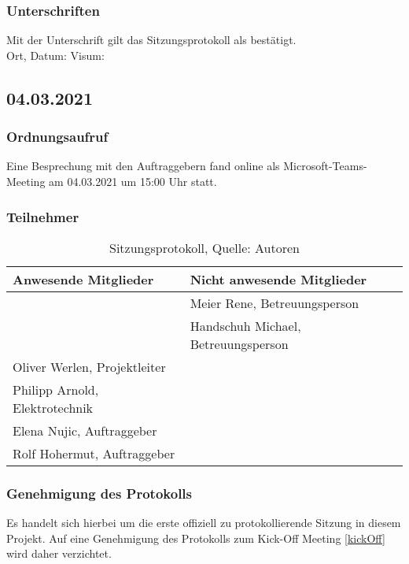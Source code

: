 \subsubsection{Unterschriften}

Mit der Unterschrift gilt das Sitzungsprotokoll als bestätigt.\\

Ort, Datum:	\underline{\hspace*{6cm}}	\hspace*{1cm} Visum:	\underline{\hspace*{4cm}}
\newpage


\subsection{04.03.2021}
\subsubsection{Ordnungsaufruf}
Eine Besprechung mit den Auftraggebern fand online als Microsoft-Teams-Meeting am 04.03.2021 um 15:00 Uhr statt.
\subsubsection{Teilnehmer}
\begin{table}[H]
	\setlength\extrarowheight{2pt} %
	\begin{tabularx}{\textwidth}{|X|X|}
		\hline
		\textbf{Anwesende Mitglieder} &  \textbf{Nicht anwesende Mitglieder} \\
		\hline
		& Meier Rene, Betreuungsperson  \\
		& Handschuh Michael, Betreuungsperson   \\
		Oliver Werlen, Projektleiter &  \\
		Philipp Arnold, Elektrotechnik & \\
		Elena Nujic, Auftraggeber & \\
		Rolf Hohermut, Auftraggeber & \\
		\hline
	\end{tabularx}
	\caption{ \label{tbl: Teilnehmerliste vom 04.03.2021}Sitzungsprotokoll, Quelle: Autoren}
\end{table}
\subsubsection{Genehmigung des Protokolls}
Es handelt sich hierbei um die erste offiziell zu protokollierende Sitzung in diesem Projekt. Auf eine Genehmigung des Protokolls zum Kick-Off Meeting \ref{kickOff} wird daher verzichtet. 
